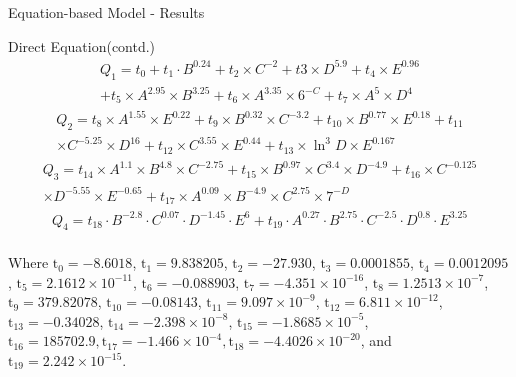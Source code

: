 \documentclass{beamer}
\begin{document}
\begin{frame}{Equation-based Model - Results}\vspace{-2mm}
    \begin{block}{Direct Equation(contd.)}\vspace{-6.2mm}
        \begin{multline*}
            Q_{1}=t_{0}+t_{1} \cdot B^{0.24}+t_{2} \times C^{-2}+t 3 \times D^{5.9}+t_{4} \times E^{0.96}\\+t_{5} \times A^{2.95} \times B^{3.25}+t_{6} \times A^{3.35} \times 6^{-C}+t_{7} \times A^{5} \times D^{4}
        \end{multline*}\vspace{-12mm}
        \begin{multline*}
            Q_{2}=t_{8} \times A^{1.55} \times E^{0.22}+t_{9} \times B^{0.32} \times C^{-3.2}+t_{10} \times B^{0.77} \times E^{0.18} +t_{11}\\ \times C^{-5.25} \times D^{16}+t_{12} \times C^{3.55} \times E^{0.44}+t_{13} \times \ln ^{3} D \times E^{0.167}
        \end{multline*}\vspace{-12mm}
        \begin{multline*}
            Q_{3}=t_{14} \times A^{1.1} \times B^{4.8} \times C^{-2.75}+t_{15} \times B^{0.97} \times C^{3.4} \times D^{-4.9}+t_{16} \times C^{-0.125}\\ \times D^{-5.55} \times E^{-0.65}+t_{17} \times A^{0.09} \times B^{-4.9} \times C^{2.75} \times 7^{-D}
        \end{multline*}\vspace{-12mm}
        \begin{multline*}
            Q_{4}=t_{18} \cdot B^{-2.8} \cdot C^{0.07} \cdot D^{-1.45} \cdot E^{6} + t_{19} \cdot A^{0.27} \cdot B^{2.75} \cdot C^{-2.5} \cdot D^{0.8} \cdot E ^ {3.25}
        \end{multline*}\;\\\vspace{-7.5mm}\justifying
        Where $\mathrm{t}_{0}=-8.6018$, $\mathrm{t}_{1}=9.838205$, $\mathrm{t}_{2}=-27.930$,  $\mathrm{t}_{3}=0.0001855$, $\mathrm{t}_{4}=0.0012095$,  $\mathrm{t}_{5}=2.1612 \times 10^{-11}$, $ \mathrm{t}_{6}=-0.088903$, $\mathrm{t}_{7}=-4.351 \times 10^{-16}$, $\mathrm{t}_{8}=1.2513 \times 10^{-7}$, $\mathrm{t}_{9}=379.82078$,  $\mathrm{t}_{10}=-0.08143$, $\mathrm{t}_{11}=9.097 \times 10^{-9}$, $\mathrm{t}_{12}=6.811 \times 10^{-12}$, $\mathrm{t}_{13}=-0.34028$, $\mathrm{t}_{14}=-2.398 \times 10^{-8}$, $ \mathrm{t}_{15}=-1.8685 \times 10^{-5}$,  $\mathrm{t}_{16}=185702.9, \mathrm{t}_{17}=-1.466 \times 10^{-4}, \mathrm{t}_{18}=-4.4026 \times 10^{-20}$, and $\mathrm{t}_{19}=2.242 \times 10^{-15} .$
    \end{block}
\end{frame}
\end{document}

